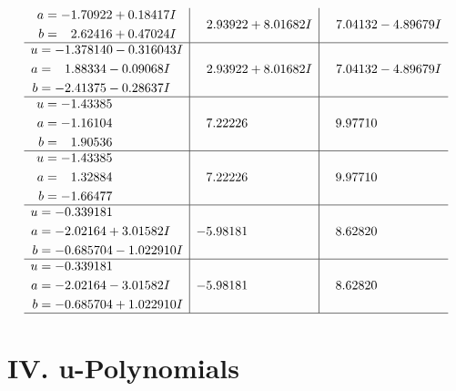 \documentclass[1p]{elsarticle_modified}
\theoremstyle{definition}
\begin{document}
$$\begin{array}{c|c|c}
\begin{aligned}
a &= -1.70922 + 0.18417 I \\
b &= \phantom{-}2.62416 + 0.47024 I\end{aligned}
 & \phantom{-}2.93922 + 8.01682 I & \phantom{-}7.04132 - 4.89679 I \\ \hline\begin{aligned}
u &= -1.378140 - 0.316043 I \\
a &= \phantom{-}1.88334 - 0.09068 I \\
b &= -2.41375 - 0.28637 I\end{aligned}
 & \phantom{-}2.93922 + 8.01682 I & \phantom{-}7.04132 - 4.89679 I \\ \hline\begin{aligned}
u &= -1.43385\phantom{ +0.000000I} \\
a &= -1.16104\phantom{ +0.000000I} \\
b &= \phantom{-}1.90536\phantom{ +0.000000I}\end{aligned}
 & \phantom{-}7.22226\phantom{ +0.000000I} & \phantom{-}9.97710\phantom{ +0.000000I} \\ \hline\begin{aligned}
u &= -1.43385\phantom{ +0.000000I} \\
a &= \phantom{-}1.32884\phantom{ +0.000000I} \\
b &= -1.66477\phantom{ +0.000000I}\end{aligned}
 & \phantom{-}7.22226\phantom{ +0.000000I} & \phantom{-}9.97710\phantom{ +0.000000I} \\ \hline\begin{aligned}
u &= -0.339181\phantom{ +0.000000I} \\
a &= -2.02164 + 3.01582 I \\
b &= -0.685704 - 1.022910 I\end{aligned}
 & -5.98181\phantom{ +0.000000I} & \phantom{-}8.62820\phantom{ +0.000000I} \\ \hline\begin{aligned}
u &= -0.339181\phantom{ +0.000000I} \\
a &= -2.02164 - 3.01582 I \\
b &= -0.685704 + 1.022910 I\end{aligned}
 & -5.98181\phantom{ +0.000000I} & \phantom{-}8.62820\phantom{ +0.000000I}\\
 \hline 
 \end{array}$$\newpage
\newpage\renewcommand{\arraystretch}{1}
\centering \section*{ IV. u-Polynomials}
\end{document}

